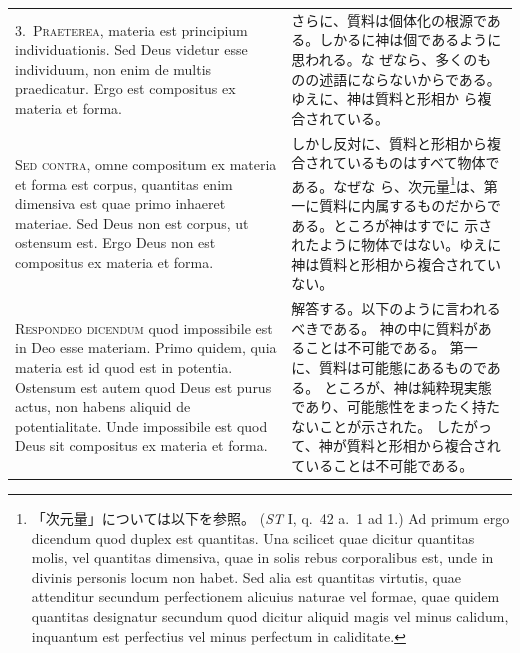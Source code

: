 \documentclass[paper=a4paper,fontsize=10pt,jafontsize=9pt,titlepage]{jlreq}
\begin{document}
\begin{longtable}{p{21em}p{21em}}
\\


3.~\textsc{Praeterea}, materia est principium individuationis. Sed Deus
 videtur esse individuum, non enim de multis praedicatur. Ergo est
 compositus ex materia et forma.

&

さらに、質料は個体化の根源である。しかるに神は個であるように思われる。な
 ぜなら、多くのものの述語にならないからである。ゆえに、神は質料と形相か
 ら複合されている。

\\


\textsc{Sed contra}, omne compositum ex materia et forma est corpus,
 quantitas enim dimensiva est quae primo inhaeret materiae. Sed Deus non
 est corpus, ut ostensum est. Ergo Deus non est compositus ex materia et
 forma.

&


しかし反対に、質料と形相から複合されているものはすべて物体である。なぜな
 ら、次元量\footnote{「次元量」については以下を参照。
(\textit{ST} I, q.~42 a.~1 ad 1.) Ad primum ergo dicendum quod duplex
 est quantitas. Una scilicet quae dicitur quantitas molis, vel quantitas
 dimensiva, quae in solis rebus corporalibus est, unde in divinis
 personis locum non habet. Sed alia est quantitas virtutis, quae
 attenditur secundum perfectionem alicuius naturae vel formae, quae
 quidem quantitas designatur secundum quod dicitur aliquid magis vel
 minus calidum, inquantum est perfectius vel minus perfectum in
 caliditate.}は、第一に質料に内属するものだからである。ところが神はすでに
 示されたように物体ではない。ゆえに神は質料と形相から複合されていない。

\\



\textsc{Respondeo dicendum} quod impossibile est in Deo esse materiam.
Primo quidem, quia materia est id quod est in potentia.
Ostensum est autem quod Deus est purus actus, non habens aliquid de
 potentialitate.
Unde impossibile est quod Deus sit compositus ex materia et forma.

&

解答する。以下のように言われるべきである。
神の中に質料があることは不可能である。
第一に、質料は可能態にあるものである。
ところが、神は純粋現実態であり、可能態性をまったく持たないことが示された。
したがって、神が質料と形相から複合されていることは不可能である。


\\


\end{longtable}
\end{document}
